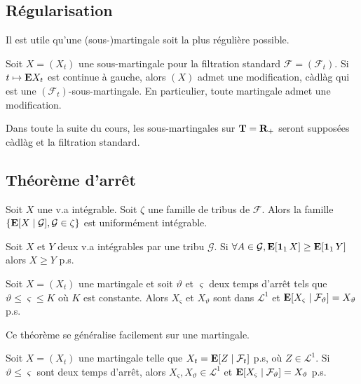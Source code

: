 \subsection{Régularisation}

	Il est utile qu'une (sous-)martingale soit la plus régulière possible.
	
	\begin{thm}[Régularisation]
		Soit $X = (X_t)$ une sous-martingale pour la filtration standard $\mathcal{F} = (\mathcal{F}_t)$.
		Si $t \mapsto \mathbf{E} X_t$ est continue à gauche, alors $(X)$ admet une modification, càdlàg qui est une $(\mathcal{F}_t)$-sous-martingale.
		En particulier, toute martingale admet une modification.
	\end{thm}
	
	Dans toute la suite du cours, les sous-martingales sur $\mathbf{T} = \mathbf{R}_+$ seront supposées càdlàg et la filtration standard.


\subsection{Théorème d'arrêt}

	\begin{lem}
		Soit $X$ une v.a intégrable.
		Soit $\zeta$ une famille de tribus de $\mathcal{F}$.
		Alors la famille $\{ \mathbf{E}[X \mid \mathcal{G}], \mathcal{G} \in \zeta \}$ est uniformément intégrable.
	\end{lem}
	
	\begin{lem}
		Soit $X$ et $Y$ deux v.a intégrables par une tribu $\mathcal{G}$.
		Si $\forall A \in \mathcal{G}, \mathbf{E} [\operatorname{\mathbf{1}}_1 X] \geq \mathbf{E} [\operatorname{\mathbf{1}}_1  Y]$ alors $X \geq Y$ p.s.
	\end{lem}
	
	\begin{thm}
		Soit $X = (X_t)$ une martingale et soit $\vartheta$ et $\varsigma$ deux temps d'arrêt tels que $\vartheta \leq \varsigma \leq K$ où $K$ est constante.
		Alors $X_{\varsigma}$ et $X_{\vartheta}$ sont dans $\mathcal{L}^1$ et $\mathbf{E}[ X_{\varsigma} \mid \mathcal{F}_{\vartheta}] = X_{\vartheta}$ p.s.
	\end{thm}
	
	Ce théorème se généralise facilement sur une martingale.
	
	\begin{thm}
		Soit $X = (X_t)$ une  martingale telle que $X_t = \mathbf{E} [Z \mid \mathcal{F}_t]$ p.s, où $Z \in \mathcal{L}^1$.
		Si $\vartheta \leq \varsigma$ sont deux temps d'arrêt, alors $X_{\varsigma}, X_{\vartheta} \in \mathcal{L}^1$ et $\mathbf{E} [X_{\varsigma} \mid \mathcal{F}_{\vartheta}] = X_{\vartheta}$ p.s.
	\end{thm}
	
